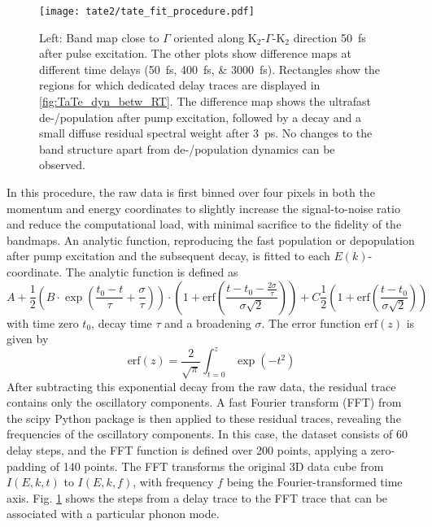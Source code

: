 \begin{figure}[b!]
	\centering
	\texttt{[image: tate2/tate\_fit\_procedure.pdf]}
	\caption{Left: Band map close to $\Gamma$ oriented along K$_2$-$\Gamma$-K$_2$ direction \qty{50}{\femto\second} after pulse excitation. The other plots show difference maps at different time delays (\qtylist{50;400;3000}{\femto\second}). Rectangles show the regions for which dedicated delay traces are displayed in \ref{fig:TaTe_dyn_betw_RT}. The difference map shows the ultrafast de-/population after pump excitation, followed by a decay and a small diffuse residual spectral weight after \qty{3}{\pico\second}. No changes to the band structure apart from de-/population dynamics can be observed.}
	\label{fig:TaTe_fit_procedure}
\end{figure}

In this procedure, the raw data is first binned over four pixels in both the momentum and energy coordinates to slightly increase the signal-to-noise ratio and reduce the computational load, with minimal sacrifice to the fidelity of the bandmaps.
An analytic function, reproducing the fast population or depopulation after pump excitation and the subsequent decay, is fitted to each $E(k)$-coordinate.
The analytic function is defined as
\begin{equation}
	A + \frac{1}{2} \left( B \cdot \exp\left(\frac{t_0-t}{\tau} + \frac{\sigma}{\tau}\right) \right) \cdot \left( 1 + \text{erf}\left(\frac{t-t_0-\frac{2\sigma}{\tau}}{\sigma\sqrt{2}}\right) \right) + C \frac{1}{2} \left( 1 + \text{erf}\left(\frac{t-t_0}{\sigma\sqrt{2}}\right) \right)
	\label{eq:decay_model}
\end{equation}
with time zero $t_0$, decay time $\tau$ and a broadening $\sigma$.
The error function $\text{erf}(z)$ is given by
\begin{equation}
	\text{erf}(z) = \frac{2}{\sqrt{\pi}} \int_{t=0}^{z} \exp(-t^2)
\end{equation}
After subtracting this exponential decay from the raw data, the residual trace contains only the oscillatory components.
A fast Fourier transform (FFT) from the scipy Python package \cite{noauthor_rfft_nodate} is then applied to these residual traces, revealing the frequencies of the oscillatory components.
In this case, the dataset consists of 60 delay steps, and the FFT function is defined over 200 points, applying a zero-padding of 140 points.
The FFT transforms the original 3D data cube from $I(E,k,t)$ to $I(E,k,f)$, with frequency $f$ being the Fourier-transformed time axis.
Fig. \ref{fig:TaTe_fit_procedure} shows the steps from a delay trace to the FFT trace that can be associated with a particular phonon mode.

